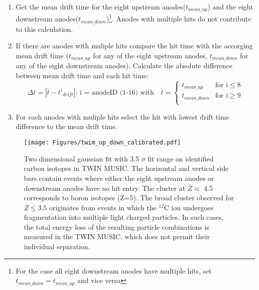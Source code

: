\begin{enumerate}
\itemsep0em
\item Get the mean drift time for the eight upstream anodes($t_{mean\_up}$) and the eight downstream anodes($t_{mean\_down}$)\footnote{For the case all eight downstream anodes have multiple hits, set $t_{mean\_down} = t_{mean\_up}$ and vice versa}. Anodes with multiple hits do not contribute to this calculation.
\item If there are anodes with muliple hits compare the hit time with the accorging mean drift time ($t_{mean\_up}$ for any of the eight upstream anodes, $t_{mean\_down}$ for any of the eight downstream anodes). Calculate the absolute difference between mean drift time and each hit time:
\begin{equation}
\Delta t = | \bar{t} - {t^i}_{drift}|; \, \text{i = anodeID (1-16) with} \quad \bar{t} = 
\begin{cases}
t_{mean\_up} & \text{for i} \leq 8\\
t_{mean\_down} & \text{for i} \geq 9 \\
\end{cases}
\end{equation}
\item For each anodes with muliple hits select the hit with lowest drift time difference to the mean drift time.
\end{enumerate}
\begin{figure}[htpb]
    \centering
    \texttt{[image: Figures/twim\_up\_down\_calibrated.pdf]}
    \caption{
    Two dimensional gaussian fit with 3.5 $\sigma$ fit range on identified carbon isotopes in TWIN MUSIC. The horizontal and vertical side bars contain events where either the eight upstream anodes or downstream anodes have no hit entry. The cluster at $\overline{Z} \approx$ 4.5 corresponds to boron isotopes (Z=5). The broad cluster observed for $\overline{Z} \leq 3.5$ originates from events in which the $^{12}$C ion undergoes fragmentation into multiple light charged particles. In such cases, the total energy loss of the resulting particle combinations is measured in the TWIN MUSIC, which does not permit their individual separation. 
    }
    \label{fig:twin_2d_gaus_cut}
\end{figure}

